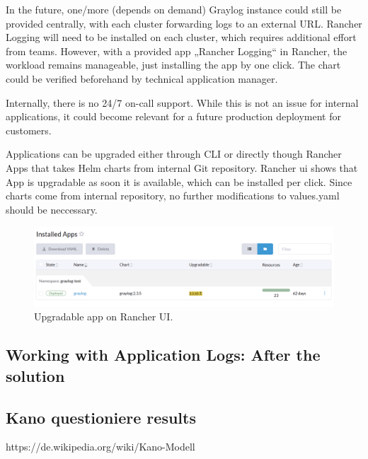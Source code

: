 \documentclass[../main.tex]{subfiles}
\begin{document}
In the future, one/more (depends on demand) Graylog instance could still be provided centrally, with each cluster forwarding logs to an external URL. Rancher Logging will need to be installed on each cluster, which requires additional effort from teams. However, with a provided app „Rancher Logging“ in Rancher, the workload remains manageable, just installing the app by one click. The chart could be verified beforehand by technical application manager.

Internally, there is no 24/7 on-call support. While this is not an issue for internal applications, it could become relevant for a future production deployment for customers.

Applications can be upgraded either through CLI or directly though Rancher Apps that takes Helm charts from internal Git repository. Rancher \gls{ui} shows that App is upgradable as soon it is available, which can be installed per click. Since charts come from internal repository, no further modifications to values.yaml should be neccessary.

\begin{figure}[h]
        \centering
        \includegraphics[scale=0.6]{img/2-background/rancher/rancher_update_graylog.png}
        \caption{Upgradable app on Rancher UI.}
        \label{fig:rancher_update_graylog}
\end{figure}

\subsection{Working with Application Logs: After the solution}

\subsection{Kano questioniere results}

https://de.wikipedia.org/wiki/Kano-Modell
\end{document}
